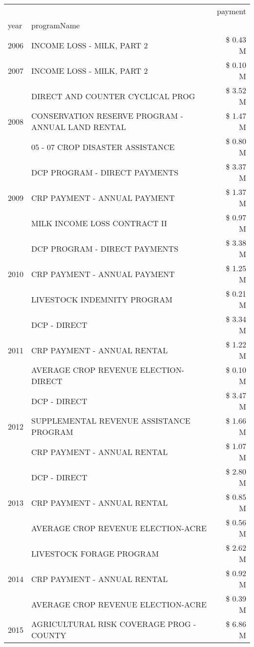 \begin{tabular}{llr}
\toprule
 &  & payment \\
year & programName &  \\
\midrule
2006 & INCOME LOSS - MILK, PART 2 & \$ 0.43 M \\
\cline{1-3}
2007 & INCOME LOSS - MILK, PART 2 & \$ 0.10 M \\
\cline{1-3}
\multirow[t]{3}{*}{2008} & DIRECT AND COUNTER CYCLICAL PROG & \$ 3.52 M \\
 & CONSERVATION RESERVE PROGRAM - ANNUAL LAND RENTAL & \$ 1.47 M \\
 & 05 - 07 CROP DISASTER ASSISTANCE & \$ 0.80 M \\
\cline{1-3}
\multirow[t]{3}{*}{2009} & DCP PROGRAM - DIRECT PAYMENTS & \$ 3.37 M \\
 & CRP PAYMENT - ANNUAL PAYMENT & \$ 1.37 M \\
 & MILK INCOME LOSS CONTRACT II & \$ 0.97 M \\
\cline{1-3}
\multirow[t]{3}{*}{2010} & DCP PROGRAM - DIRECT PAYMENTS & \$ 3.38 M \\
 & CRP PAYMENT - ANNUAL PAYMENT & \$ 1.25 M \\
 & LIVESTOCK INDEMNITY PROGRAM & \$ 0.21 M \\
\cline{1-3}
\multirow[t]{3}{*}{2011} & DCP - DIRECT & \$ 3.34 M \\
 & CRP PAYMENT - ANNUAL RENTAL & \$ 1.22 M \\
 & AVERAGE CROP REVENUE ELECTION-DIRECT & \$ 0.10 M \\
\cline{1-3}
\multirow[t]{3}{*}{2012} & DCP - DIRECT & \$ 3.47 M \\
 & SUPPLEMENTAL REVENUE ASSISTANCE PROGRAM & \$ 1.66 M \\
 & CRP PAYMENT - ANNUAL RENTAL & \$ 1.07 M \\
\cline{1-3}
\multirow[t]{3}{*}{2013} & DCP - DIRECT & \$ 2.80 M \\
 & CRP PAYMENT - ANNUAL RENTAL & \$ 0.85 M \\
 & AVERAGE CROP REVENUE ELECTION-ACRE & \$ 0.56 M \\
\cline{1-3}
\multirow[t]{3}{*}{2014} & LIVESTOCK FORAGE PROGRAM & \$ 2.62 M \\
 & CRP PAYMENT - ANNUAL RENTAL & \$ 0.92 M \\
 & AVERAGE CROP REVENUE ELECTION-ACRE & \$ 0.39 M \\
\cline{1-3}
\multirow[t]{3}{*}{2015} & AGRICULTURAL RISK COVERAGE PROG - COUNTY & \$ 6.86 M \\

\end{tabular}
